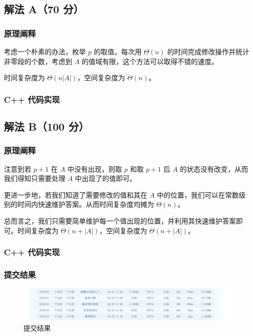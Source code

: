 	\subsection{解法 A（70 分）}
		\subsubsection{原理阐释}
			\par 考虑一个朴素的办法，枚举 $p$ 的取值，每次用 $\Theta(n)$ 的时间完成修改操作并统计非零段的个数，考虑到 $A$ 的值域有限，这个方法可以取得不错的速度。
			\par 时间复杂度为 $\Theta(n\left\lvert A\right\rvert)$，空间复杂度为 $\Theta(n)$。
		\subsubsection{C++ 代码实现}
			
	\subsection{解法 B（100 分）}
		\subsubsection{原理阐释}
			\par 注意到若 $p+1$ 在 $A$ 中没有出现，则取 $p$ 和取 $p+1$ 后 $A$ 的状态没有改变，从而我们得知只需要处理 $A$ 中出现了的值即可。
			\par 更进一步地，若我们知道了需要修改的值和其在 $A$ 中的位置，我们可以在常数级别的时间内快速维护答案。从而时间复杂度均摊为 $\Theta(n)$。
			\par 总而言之，我们只需要简单维护每一个值出现的位置，并利用其快速维护答案即可。时间复杂度为 $\Theta(n+\left\lvert A\right\rvert)$，空间复杂度为 $\Theta(n+\left\lvert A\right\rvert)$。
		\subsubsection{C++ 代码实现}
			
		\subsubsection{提交结果}
			\begin{figure}[htbp]
				\centering
				\includegraphics[width=1\textwidth]{result.png}
				\caption{提交结果}
			\end{figure}